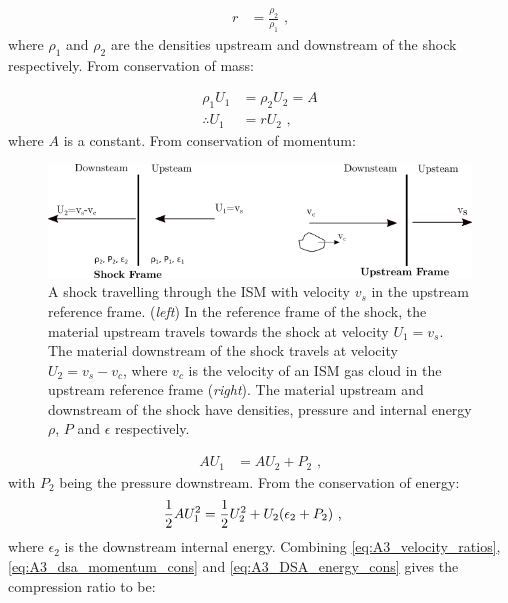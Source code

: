 \begin{equation}
    \begin{aligned}
        r&=\frac{\rho_2}{\rho_1}\text{ ,}
    \end{aligned}
\end{equation}
\noindent where $\rho_1$ and $\rho_2$ are the densities upstream and downstream of the shock respectively. From conservation of mass:

\begin{equation}
    \begin{aligned}
        \rho_1U_{1}&=\rho_2U_2=A \\
        \therefore U_{1}&=rU_{2}\text{ ,}
    \end{aligned} \label{eq:A3_velocity_ratios}
\end{equation}
\noindent where $A$ is a constant. From conservation of momentum:
\begin{figure}[!b]
	\centering
	\includegraphics[width=1.0\textwidth]{A3_Diffusive_Shock_Acceleration/Images/upstream_downstream.png}
	\caption{A shock travelling through the ISM with velocity $v_s$ in the upstream reference frame. (\textit{left}) In the reference frame of the shock, the material upstream travels towards the shock at velocity $U_1=v_s$. The material downstream of the shock travels at velocity $U_2=v_s-v_c$, where $v_c$ is the velocity of an ISM gas cloud in the upstream reference frame (\textit{right}). The material upstream and downstream of the shock have densities, pressure and internal energy $\rho$, $P$ and $\epsilon$ respectively.}
	\label{fig:A3_shock_dynamics2}
\end{figure}
\begin{subequations}
    \begin{alignat}{1}
        AU_{1}&=AU_{2}+P_2\text{ ,}
    \end{alignat} \label{eq:A3_dsa_momentum_cons}
\end{subequations}
\noindent with $P_2$ being the pressure downstream. From the conservation of energy:
\begin{equation}
    \begin{aligned}
        \frac{1}{2}AU_{1}^2&=\frac{1}{2}U_{2}^2+U_{2}\qty(\epsilon_2+P_2)\text{ ,}
    \end{aligned} \label{eq:A3_DSA_energy_cons}
\end{equation}
\noindent where $\epsilon_2$ is the downstream internal energy. Combining \autoref{eq:A3_velocity_ratios}, \autoref{eq:A3_dsa_momentum_cons} and \autoref{eq:A3_DSA_energy_cons} gives the compression ratio to be:

